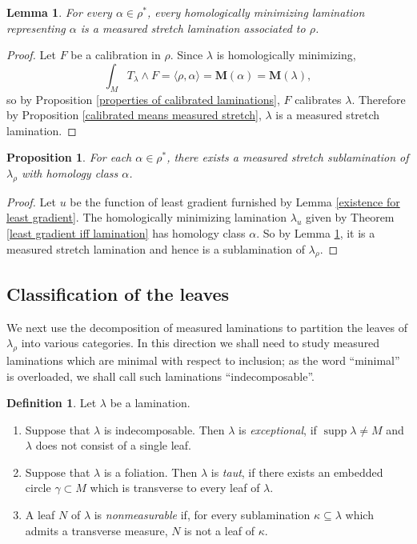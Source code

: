 \documentclass[reqno,11pt]{amsart}
\DeclareMathOperator{\supp}{supp}
\newcommand{\Mass}{\mathbf M}
\newcommand{\dfn}[1]{\emph{#1}\index{#1}}
\newtheorem{lemma}[theorem]{Lemma}
\newtheorem{proposition}[theorem]{Proposition}
\theoremstyle{definition}
\newtheorem{definition}[theorem]{Definition}
\numberwithin{equation}{section}
\begin{document}
\begin{lemma}\label{homologically minimizing means measured stretch}
For every $\alpha \in \rho^*$, every homologically minimizing lamination representing $\alpha$ is a measured stretch lamination associated to $\rho$.
\end{lemma}
\begin{proof}
Let $F$ be a calibration in $\rho$.
Since $\lambda$ is homologically minimizing,
$$\int_M T_\lambda \wedge F = \langle \rho, \alpha\rangle = \Mass(\alpha) = \Mass(\lambda),$$
so by Proposition \ref{properties of calibrated laminations}, $F$ calibrates $\lambda$.
Therefore by Proposition \ref{calibrated means measured stretch}, $\lambda$ is a measured stretch lamination.
\end{proof}

\begin{proposition}\label{enough measures in canonical lamination}
For each $\alpha \in \rho^*$, there exists a measured stretch sublamination of $\lambda_\rho$ with homology class $\alpha$.
\end{proposition}
\begin{proof}
Let $u$ be the function of least gradient furnished by Lemma \ref{existence for least gradient}.
The homologically minimizing lamination $\lambda_u$ given by Theorem \ref{least gradient iff lamination} has homology class $\alpha$.
So by Lemma \ref{homologically minimizing means measured stretch}, it is a measured stretch lamination and hence is a sublamination of $\lambda_\rho$.
\end{proof}



\subsection{Classification of the leaves}
We next use the decomposition of measured laminations \cite[{\S}I.3]{Morgan88} to partition the leaves of $\lambda_\rho$ into various categories.
In this direction we shall need to study measured laminations which are minimal with respect to inclusion; as the word ``minimal'' is overloaded, we shall call such laminations ``indecomposable''.

\begin{definition}
Let $\lambda$ be a lamination.
\begin{enumerate}
\item Suppose that $\lambda$ is indecomposable. Then $\lambda$ is \dfn{exceptional}, if $\supp \lambda \neq M$ and $\lambda$ does not consist of a single leaf.
\item Suppose that $\lambda$ is a foliation. Then $\lambda$ is \dfn{taut}, if there exists an embedded circle $\gamma \subset M$ which is transverse to every leaf of $\lambda$.
\item A leaf $N$ of $\lambda$ is \dfn{nonmeasurable} if, for every sublamination $\kappa \subseteq \lambda$ which admits a transverse measure, $N$ is not a leaf of $\kappa$.
\end{enumerate}
\end{definition}
\end{document}
